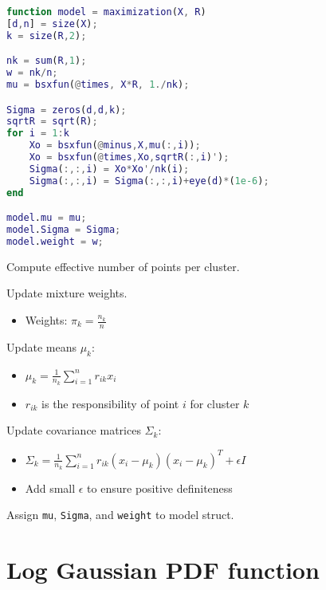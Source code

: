 \documentclass[11pt]{article}
\begin{document}
\begin{minipage}{\textwidth}
\begin{minipage}[t]{0.48\textwidth}
\begin{lstlisting}[language=Matlab, firstnumber=106]
function model = maximization(X, R)
[d,n] = size(X);
k = size(R,2);

nk = sum(R,1);
w = nk/n;
mu = bsxfun(@times, X*R, 1./nk);

Sigma = zeros(d,d,k);
sqrtR = sqrt(R);
for i = 1:k
    Xo = bsxfun(@minus,X,mu(:,i));
    Xo = bsxfun(@times,Xo,sqrtR(:,i)');
    Sigma(:,:,i) = Xo*Xo'/nk(i);
    Sigma(:,:,i) = Sigma(:,:,i)+eye(d)*(1e-6);
end

model.mu = mu;
model.Sigma = Sigma;
model.weight = w;
\end{lstlisting}
\end{minipage}
\hfill
\begin{minipage}[t]{0.48\textwidth}

Compute effective number of points per cluster.

Update mixture weights.
\begin{itemize}
    \item Weights: $\pi_k = \frac{n_k}{n}$
\end{itemize}

Update means $\mu_k$:
\begin{itemize}
    \item $\mu_k = \frac{1}{n_k} \sum_{i=1}^{n} r_{ik} x_i$
    \item $r_{ik}$ is the responsibility of point $i$ for cluster $k$
\end{itemize}

Update covariance matrices $\Sigma_k$:
\begin{itemize}
    \item $\Sigma_k = \frac{1}{n_k} \sum_{i=1}^{n} r_{ik} (x_i - \mu_k)(x_i - \mu_k)^T + \epsilon I$
    \item Add small $\epsilon$ to ensure positive definiteness
\end{itemize}

Assign \texttt{mu}, \texttt{Sigma}, and \texttt{weight} to model struct.

\end{minipage}
\end{minipage}

\vspace{0.5cm}

\section{Log Gaussian PDF function}
\end{document}
